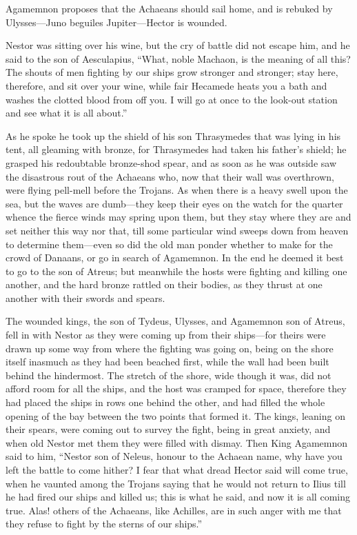 
Agamemnon proposes that the Achaeans should sail home, and is rebuked by
Ulysses—Juno beguiles Jupiter—Hector is wounded.

Nestor was sitting over his wine, but the cry of battle did not escape
him, and he said to the son of Aesculapius, “What, noble Machaon, is the
meaning of all this? The shouts of men fighting by our ships grow stronger
and stronger; stay here, therefore, and sit over your wine, while fair
Hecamede heats you a bath and washes the clotted blood from off you. I
will go at once to the look-out station and see what it is all about.”

As he spoke he took up the shield of his son Thrasymedes that was lying in
his tent, all gleaming with bronze, for Thrasymedes had taken his father’s
shield; he grasped his redoubtable bronze-shod spear, and as soon as he
was outside saw the disastrous rout of the Achaeans who, now that their
wall was overthrown, were flying pell-mell before the Trojans. As when
there is a heavy swell upon the sea, but the waves are dumb—they
keep their eyes on the watch for the quarter whence the fierce winds may
spring upon them, but they stay where they are and set neither this way
nor that, till some particular wind sweeps down from heaven to determine
them—even so did the old man ponder whether to make for the crowd of
Danaans, or go in search of Agamemnon. In the end he deemed it best to go
to the son of Atreus; but meanwhile the hosts were fighting and killing
one another, and the hard bronze rattled on their bodies, as they thrust
at one another with their swords and spears.

The wounded kings, the son of Tydeus, Ulysses, and Agamemnon son of
Atreus, fell in with Nestor as they were coming up from their ships—for
theirs were drawn up some way from where the fighting was going on, being
on the shore itself inasmuch as they had been beached first, while the
wall had been built behind the hindermost. The stretch of the shore, wide
though it was, did not afford room for all the ships, and the host was
cramped for space, therefore they had placed the ships in rows one behind
the other, and had filled the whole opening of the bay between the two
points that formed it. The kings, leaning on their spears, were coming out
to survey the fight, being in great anxiety, and when old Nestor met them
they were filled with dismay. Then King Agamemnon said to him, “Nestor son
of Neleus, honour to the Achaean name, why have you left the battle to
come hither? I fear that what dread Hector said will come true, when he
vaunted among the Trojans saying that he would not return to Ilius till he
had fired our ships and killed us; this is what he said, and now it is all
coming true. Alas! others of the Achaeans, like Achilles, are in such
anger with me that they refuse to fight by the sterns of our ships.”

